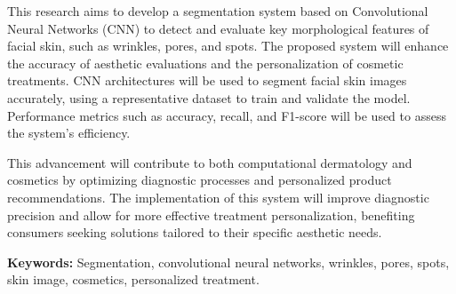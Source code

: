 This research aims to develop a segmentation system based on Convolutional Neural Networks (CNN) to detect and evaluate key morphological features of facial skin, such as wrinkles, pores, and spots. The proposed system will enhance the accuracy of aesthetic evaluations and the personalization of cosmetic treatments. CNN architectures will be used to segment facial skin images accurately, using a representative dataset to train and validate the model. Performance metrics such as accuracy, recall, and F1-score will be used to assess the system's efficiency.

This advancement will contribute to both computational dermatology and cosmetics by optimizing diagnostic processes and personalized product recommendations. The implementation of this system will improve diagnostic precision and allow for more effective treatment personalization, benefiting consumers seeking solutions tailored to their specific aesthetic needs.

\textbf{Keywords:} Segmentation, convolutional neural networks, wrinkles, pores, spots, skin image, cosmetics, personalized treatment.
